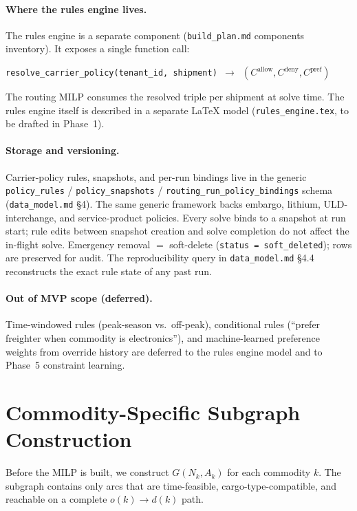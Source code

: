 \documentclass[11pt,a4paper]{article}
\theoremstyle{definition}
\begin{document}
\paragraph{Where the rules engine lives.}
The rules engine is a separate component (\texttt{build\_plan.md} components
inventory). It exposes a single function call:
\begin{center}
\texttt{resolve\_carrier\_policy(tenant\_id, shipment) $\to$ $(C^{\text{allow}}, C^{\text{deny}}, C^{\text{pref}})$}
\end{center}
The routing MILP consumes the resolved triple per shipment at solve time. The rules
engine itself is described in a separate LaTeX model (\texttt{rules\_engine.tex}, to
be drafted in Phase~1).

\paragraph{Storage and versioning.}
Carrier-policy rules, snapshots, and per-run bindings live in the generic
\texttt{policy\_rules} / \texttt{policy\_snapshots} /
\texttt{routing\_run\_policy\_bindings} schema (\texttt{data\_model.md} \S4). The
same generic framework backs embargo, lithium, ULD-interchange, and
service-product policies. Every solve binds to a snapshot at run start; rule edits
between snapshot creation and solve completion do not affect the in-flight solve.
Emergency removal $=$ soft-delete (\texttt{status = soft\_deleted}); rows are
preserved for audit. The reproducibility query in \texttt{data\_model.md} \S4.4
reconstructs the exact rule state of any past run.

\paragraph{Out of MVP scope (deferred).}
Time-windowed rules (peak-season vs.\ off-peak), conditional rules (``prefer
freighter when commodity is electronics''), and machine-learned preference weights
from override history are deferred to the rules engine model and to Phase~5
constraint learning.

\section{Commodity-Specific Subgraph Construction}
\label{sec:prefilter}

Before the MILP is built, we construct $G(N_k, A_k)$ for each commodity $k$. The subgraph
contains only arcs that are time-feasible, cargo-type-compatible, and reachable on a complete
$o(k) \to d(k)$ path.
\end{document}
